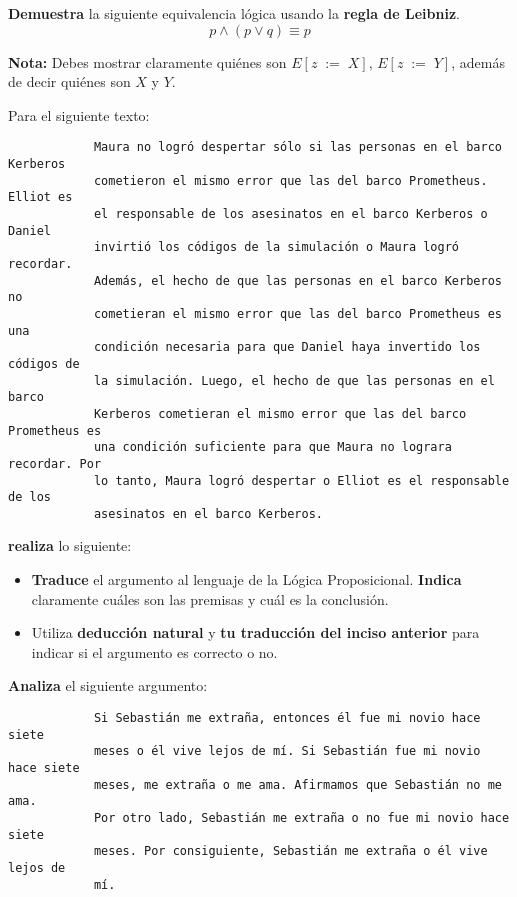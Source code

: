 \documentclass[oneside]{style}
\begin{document}
\begin{questions}[label=\protect\circled{\bfseries\arabic*}]
    \question
    {
        \textbf{Demuestra} la siguiente equivalencia lógica usando la 
        \textbf{regla de Leibniz}.
        \begin{equation*}
            p \land (p \lor q) \equiv p
        \end{equation*}

        \textbf{Nota:} Debes mostrar claramente quiénes son $E[z \; := \; X]$, 
        $E[z \; := \; Y]$, además de decir quiénes son $X$ y $Y$. 
    }

    \question
    {
        Para el siguiente texto:
        \begin{verbatim}
            Maura no logró despertar sólo si las personas en el barco Kerberos
            cometieron el mismo error que las del barco Prometheus. Elliot es 
            el responsable de los asesinatos en el barco Kerberos o Daniel 
            invirtió los códigos de la simulación o Maura logró recordar.  
            Además, el hecho de que las personas en el barco Kerberos no 
            cometieran el mismo error que las del barco Prometheus es una 
            condición necesaria para que Daniel haya invertido los códigos de 
            la simulación. Luego, el hecho de que las personas en el barco 
            Kerberos cometieran el mismo error que las del barco Prometheus es 
            una condición suficiente para que Maura no lograra recordar. Por 
            lo tanto, Maura logró despertar o Elliot es el responsable de los 
            asesinatos en el barco Kerberos. 
        \end{verbatim}

        \textbf{realiza} lo siguiente:
        \begin{itemize}
            \item \textbf{Traduce} el argumento al lenguaje de la Lógica 
            Proposicional. \textbf{Indica} claramente cuáles son las premisas 
            y cuál es la conclusión. 
            
            \item Utiliza \textbf{deducción natural} y \textbf{tu 
            traducción del inciso anterior} para indicar si el argumento es 
            correcto o no. 
        \end{itemize}
    }   

    \newpage
    \question
    {
        \textbf{Analiza} el siguiente argumento:
        \begin{verbatim}
            Si Sebastián me extraña, entonces él fue mi novio hace siete 
            meses o él vive lejos de mí. Si Sebastián fue mi novio hace siete
            meses, me extraña o me ama. Afirmamos que Sebastián no me ama. 
            Por otro lado, Sebastián me extraña o no fue mi novio hace siete 
            meses. Por consiguiente, Sebastián me extraña o él vive lejos de 
            mí. 
        \end{verbatim}

}
\end{questions}
\end{document}
